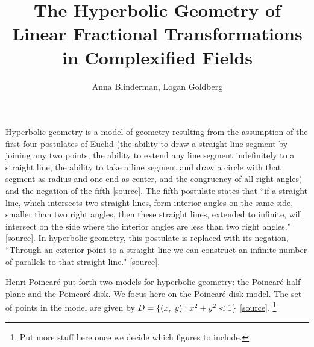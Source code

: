 \documentclass[12pt]{article}
\title{The Hyperbolic Geometry of Linear Fractional Transformations in Complexified Fields}
\author{Anna Blinderman, Logan Goldberg}
\date{}
\newcommand{\poincare}{Poincar\'{e} }
\newcommand{\ttc}{, \hspace{1mm}}
\theoremstyle{plain}
\theoremstyle{definition}
\begin{document}
\maketitle


Hyperbolic geometry is a model of geometry resulting from the assumption of the first four postulates of Euclid (the ability to draw a straight line segment by joining any two points, the ability to extend any line segment indefinitely to a straight line, the ability to take a line segment and draw a circle with that segment as radius and one end as center, and the congruency of all right angles) and the negation of the fifth \href{http://mathworld.wolfram.com/EuclidsPostulates.html}{[source]}. The fifth postulate states that ``if a straight line, which intersects two straight lines, form interior angles on the same side, smaller than two right angles, then these straight lines, extended to infinite, will intersect on the side where the interior angles are less than two right angles." [\href{https://pdfs.semanticscholar.org/ed0e/d1fee9bbe60b24be373ac1207d17ecb90b4a.pdf}{source}]. In hyperbolic geometry, this postulate is replaced with its negation, ``Through an exterior point to a straight line we can construct an infinite number of parallels to that straight line." \href{https://pdfs.semanticscholar.org/ed0e/d1fee9bbe60b24be373ac1207d17ecb90b4a.pdf}{[source]}.
	
Henri \poincare put forth two models for hyperbolic geometry: the \poincare half-plane and the \poincare disk. We focus here on the \poincare disk model. The set of points in the model are given by $D = \{(x\ttc y): x^2 + y^2 < 1\}$ \href{http://math2.uncc.edu/~frothe/3181alllhyp1_7.pdf}{[source]}.  \footnote{Put more stuff here once we decide which figures to include.} 
	
\end{document}
